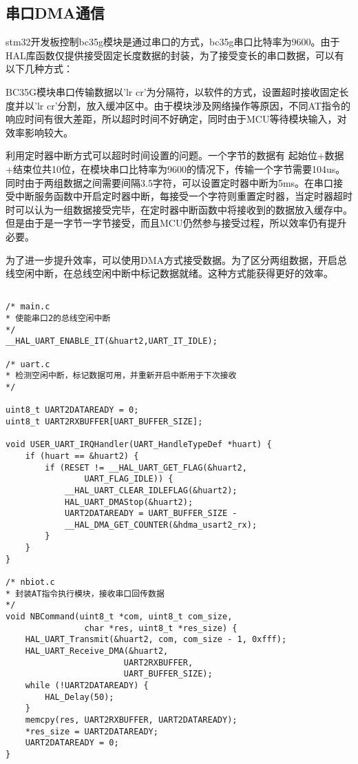 \subsection{串口DMA通信}

stm32开发板控制bc35g模块是通过串口的方式，bc35g串口比特率为9600。由于HAL库函数仅提供接受固定长度数据的封装，为了接受变长的串口数据，可以有以下几种方式：

BC35G模块串口传输数据以'lr cr'为分隔符，以软件的方式，设置超时接收固定长度并以'lr cr'分割，放入缓冲区中。由于模块涉及网络操作等原因，不同AT指令的响应时间有很大差距，所以超时时间不好确定，同时由于MCU等待模块输入，对效率影响较大。

利用定时器中断方式可以超时时间设置的问题。一个字节的数据有 起始位+数据+结束位共10位，在模块串口比特率为9600的情况下，传输一个字节需要104us。同时由于两组数据之间需要间隔3.5字符，可以设置定时器中断为5ms。在串口接受中断服务函数中开启定时器中断，每接受一个字符则重置定时器，当定时器超时时可以认为一组数据接受完毕，在定时器中断函数中将接收到的数据放入缓存中。但是由于是一字节一字节接受，而且MCU仍然参与接受过程，所以效率仍有提升必要。

为了进一步提升效率，可以使用DMA方式接受数据。为了区分两组数据，开启总线空闲中断，在总线空闲中断中标记数据就绪。这种方式能获得更好的效率。

\begin{lstlisting}

/* main.c
* 使能串口2的总线空闲中断
*/
__HAL_UART_ENABLE_IT(&huart2,UART_IT_IDLE);

/* uart.c
* 检测空闲中断，标记数据可用，并重新开启中断用于下次接收
*/

uint8_t UART2DATAREADY = 0;
uint8_t UART2RXBUFFER[UART_BUFFER_SIZE];

void USER_UART_IRQHandler(UART_HandleTypeDef *huart) {
    if (huart == &huart2) {
        if (RESET != __HAL_UART_GET_FLAG(&huart2, 
                UART_FLAG_IDLE)) {
            __HAL_UART_CLEAR_IDLEFLAG(&huart2);
            HAL_UART_DMAStop(&huart2);
            UART2DATAREADY = UART_BUFFER_SIZE - 
            __HAL_DMA_GET_COUNTER(&hdma_usart2_rx);
        }
    }
}

/* nbiot.c
* 封装AT指令执行模块，接收串口回传数据
*/
void NBCommand(uint8_t *com, uint8_t com_size, 
                char *res, uint8_t *res_size) {
    HAL_UART_Transmit(&huart2, com, com_size - 1, 0xfff);
    HAL_UART_Receive_DMA(&huart2, 
                        UART2RXBUFFER, 
                        UART_BUFFER_SIZE);
    while (!UART2DATAREADY) {
        HAL_Delay(50);
    }
    memcpy(res, UART2RXBUFFER, UART2DATAREADY);
    *res_size = UART2DATAREADY;
    UART2DATAREADY = 0;
}

\end{lstlisting}

